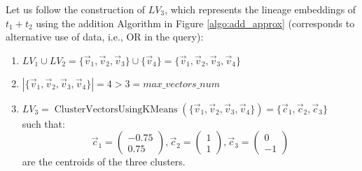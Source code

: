 \begin{example-withrun}
    Let us follow the construction of $LV_3$, which represents the lineage embeddings of $t_1 + t_2$ using the addition Algorithm in Figure \ref{algo:add_approx} (corresponds to alternative use of data, i.e., OR in the query):
    \begin{enumerate}
        \item $LV_1 \cup LV_2 = \{\vec v_1, \vec v_2, \vec v_3\} \cup \{\vec v_4\} = \{\vec v_1, \vec v_2, \vec v_3, \vec v_4\}$
        \item $|\{\vec v_1, \vec v_2, \vec v_3, \vec v_4\}| = 4 > 3 = max\_vectors\_num$
        \item $LV_3 = \operatorname{ClusterVectorsUsingKMeans}(\{\vec v_1, \vec v_2, \vec v_3, \vec v_4\}) = \{\vec c_1, \vec c_2, \vec c_3\}$\\
        such that: 
        \begin{equation*}
            \vec c_1 = \begin{pmatrix} -0.75\\ 0.75 \end{pmatrix},
            \vec c_2 = \begin{pmatrix} 1\\ 1 \end{pmatrix},
            \vec c_3 = \begin{pmatrix} 0\\ -1 \end{pmatrix}
        \end{equation*}
        are the centroids of the three clusters.
    \end{enumerate}
\end{example-withrun}
